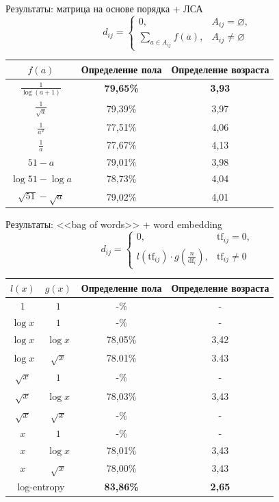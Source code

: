 \documentclass{beamer}
\begin{document}
\begin{frame}{Результаты: матрица на основе порядка + ЛСА}
    \[d_{ij} = \begin{cases}
              0,& A_{ij} = \varnothing,\\
              \sum\limits_{a \in A_{ij}}{f(a)},& A_{ij} \ne \varnothing
          \end{cases}\]
\begin{table}[!h]
\centering
\begin{tabular}{|c|c|c|}\hline
    \boldmath$f(a)$ & \textbf{Определение пола} & \textbf{Определение возраста} \\\hline
    $\frac{1}{\log(a + 1)}$ & \textbf{79,65\%} & \textbf{3,93} \\\hline
    $\frac{1}{\sqrt{a}}$ & 79,39\% & 3,97 \\\hline
    $\frac{1}{a^2}$ & 77,51\% & 4,06 \\\hline
    $\frac{1}{a}$ & 77,67\% & 4,13 \\\hline
    $51 - a$ & 79,01\% & 3,98 \\\hline
    $\log{51} - \log{a}$ & 78,73\% & 4,04 \\\hline
    $\sqrt{51} - \sqrt{a}$ & 79,02\% & 4,01 \\\hline
\end{tabular}
\end{table}
\end{frame}

\begin{frame}{Результаты: <<bag of words>> + word embedding}
    \[d_{ij} = \begin{cases}
              0,& \mathrm{tf}_{ij} = 0,\\
              l(\mathrm{tf}_{ij}) \cdot g(\frac{n}{\mathrm{df}_{i}}),& \mathrm{tf}_{ij} \ne 0
        \end{cases}\]
\begin{table}[!h]
\centering
\begin{tabular}{|c|c|c|c|}\hline
    \boldmath$l(x)$ & \boldmath$g(x)$ & \textbf{Определение пола} & \textbf{Определение возраста} \\\hline
    $1$ & $1$ & -\% & - \\\hline
    $\log{x}$ & $1$ & -\% & - \\\hline
    $\log{x}$ & $\log{x}$ & 78,05\% & 3,42 \\\hline
    $\log{x}$ & $\sqrt{x}$ & 78.01\% & 3.43 \\\hline
    $\sqrt{x}$ & $1$ & -\% & - \\\hline
    $\sqrt{x}$ & $\log{x}$ & 78,03\% & 3,43 \\\hline
    $\sqrt{x}$ & $\sqrt{x}$ & -\% & - \\\hline
    $x$ & $1$ & -\% & - \\\hline
    $x$ & $\log{x}$ & 78,01\% & 3,43 \\\hline
    $x$ & $\sqrt{x}$ & 78,00\% & 3,43 \\\hline
    \multicolumn{2}{|c|}{log-entropy} & \textbf{83,86\%} & \textbf{2,65} \\\hline
\end{tabular}
\end{table}
\end{frame}
\end{document}
